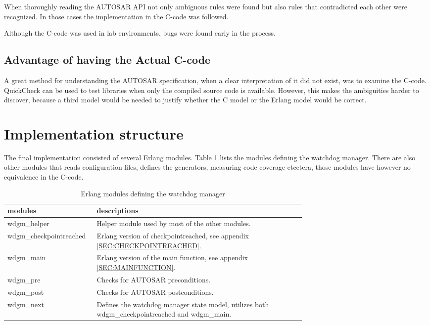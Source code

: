 When thoroughly reading the AUTOSAR API not only ambiguous rules were
found but also rules that contradicted each other were recognized. In
those cases the implementation in the C-code was followed.

Although the C-code was used in lab environments, bugs were found early
in the process.

\subsection{Advantage of having the Actual C-code}
A great method for understanding the AUTOSAR specification, when a clear
interpretation of it did not exist, was to examine the C-code.
QuickCheck can be used to test libraries when only the compiled
source code is available. However, this makes the ambiguities harder to
discover, because a third model would be needed to justify whether the C
model or the Erlang model would be correct.

\section{Implementation structure}
The final implementation consisted of several Erlang modules. Table
\ref{TABLE:MODULES} lists the modules defining the watchdog manager.
There are also other modules that reads configuration files, defines the
generators, measuring code coverage etcetera, those modules have however no
equivalence in the C-code.

\begin{table}[!ht]
\caption{Erlang modules defining the watchdog manager}
\label{TABLE:MODULES}
\begin{tabular}{l|p{0.7\linewidth}}
\hline
modules & descriptions \\
\hline
wdgm\_helper            & Helper module used by most of the other modules. \\
wdgm\_checkpointreached & Erlang version of checkpointreached, see appendix \ref{SEC:CHECKPOINTREACHED}. \\
wdgm\_main              & Erlang version of the main function, see appendix \ref{SEC:MAINFUNCTION}. \\
wdgm\_pre               & Checks for AUTOSAR preconditions.\\
wdgm\_post              & Checks for AUTOSAR postconditions.\\
wdgm\_next              & Defines the watchdog manager state model,
utilizes both wdgm\_checkpointreached and wdgm\_main.
\end{tabular}
\end{table}

